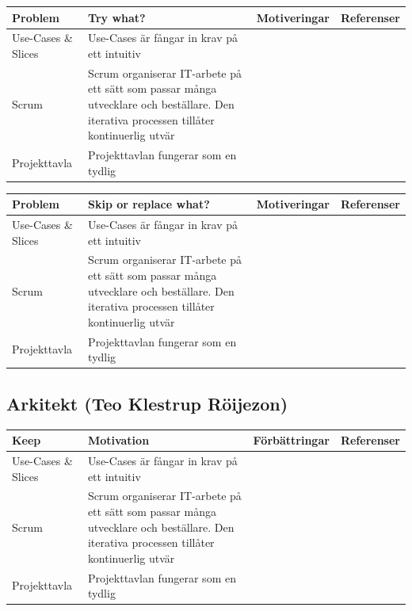 \documentclass[conference,a4paper]{IEEEtran}
\newcommand\Tstrut{\rule{0pt}{2.6ex}}       %
\newcommand\Bstrut{\rule[-0.9ex]{0pt}{0pt}} %
\newcommand{\TBstrut}{\Tstrut\Bstrut} %
\begin{document}
\begin{table}[H]
	\small
  \centering
	\begin{tabular}{|p{1.5cm}|p{2cm}|p{1.8cm}|p{1.5cm}|} %
    \hline
    Problem & Try what? & Motiveringar & Referenser \TBstrut \\
    \hline
    Use-Cases \& Slices & Use-Cases är fångar in krav på ett intuitiv & & \TBstrut \\
    \hline
    Scrum & Scrum organiserar IT-arbete på ett sätt som passar många utvecklare och beställare. Den iterativa processen tillåter kontinuerlig utvär & & \TBstrut \\
    \hline
    Projekttavla & Projekttavlan fungerar som en tydlig & & \TBstrut \\
    \hline
  \end{tabular}
\end{table}

\begin{table}[H]
	\small
  \centering
	\begin{tabular}{|p{1.5cm}|p{2cm}|p{1.8cm}|p{1.5cm}|} %
    \hline
    Problem & Skip or replace what? & Motiveringar & Referenser \TBstrut \\
    \hline
    Use-Cases \& Slices & Use-Cases är fångar in krav på ett intuitiv & & \TBstrut \\
    \hline
    Scrum & Scrum organiserar IT-arbete på ett sätt som passar många utvecklare och beställare. Den iterativa processen tillåter kontinuerlig utvär & & \TBstrut \\
    \hline
    Projekttavla & Projekttavlan fungerar som en tydlig & & \TBstrut \\
    \hline
  \end{tabular}
\end{table}

\subsection{Arkitekt (Teo Klestrup Röijezon)}
\begin{table}[H]
	\small
  \centering
	\begin{tabular}{|p{1.5cm}|p{2cm}|p{1.8cm}|p{1.5cm}|} %
    \hline
    Keep & Motivation & Förbättringar & Referenser \TBstrut \\
    \hline
    Use-Cases \& Slices & Use-Cases är fångar in krav på ett intuitiv & & \TBstrut \\
    \hline
    Scrum & Scrum organiserar IT-arbete på ett sätt som passar många utvecklare och beställare. Den iterativa processen tillåter kontinuerlig utvär & & \TBstrut \\
    \hline
    Projekttavla & Projekttavlan fungerar som en tydlig & & \TBstrut \\
    \hline
  \end{tabular}
\end{table}
\end{document}
